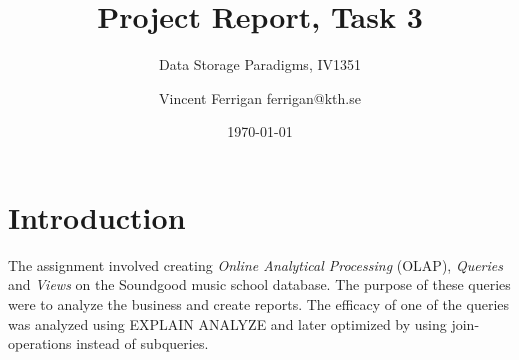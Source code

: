 \documentclass[a4paper]{scrartcl}
\title{Project Report, Task 3}
\subtitle{Data Storage Paradigms, IV1351}
\author{Vincent Ferrigan ferrigan@kth.se}
\date{\today}
\begin{document}
\maketitle
    







\section{Introduction}
The assignment involved creating 
\emph{Online Analytical Processing} (OLAP), \emph{Queries} and \emph{Views} 
on the Soundgood music school database. 
The purpose of these queries were to analyze the business and create reports.
The efficacy of one of the queries was analyzed using EXPLAIN ANALYZE and later
optimized by using join-operations instead of subqueries. 
\end{document}
